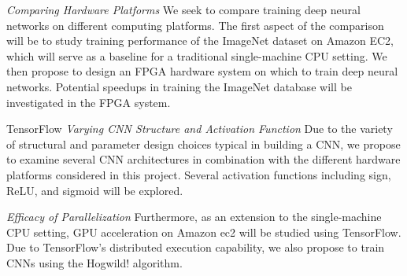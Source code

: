 \textit{Comparing Hardware Platforms}
We seek to compare training deep neural networks on different computing platforms.  The first aspect of the comparison will be to study training performance of the ImageNet dataset on Amazon EC2, which will serve as a baseline for a traditional single-machine CPU setting.  We then propose to design an FPGA hardware system on which to train deep neural networks.  Potential speedups in training the ImageNet database will be investigated in the FPGA system.  

TensorFlow
\textit{Varying CNN Structure and Activation Function}
Due to the variety of structural and parameter design choices typical in building a CNN, we propose to examine several CNN architectures in combination with the different hardware platforms considered in this project.  Several activation functions including sign, ReLU, and sigmoid will be explored.

\textit{Efficacy of Parallelization}
Furthermore, as an extension to the single-machine CPU setting, GPU acceleration on Amazon ec2 will be studied using TensorFlow.  Due to TensorFlow’s distributed execution capability, we also propose to train CNNs using the Hogwild! algorithm.